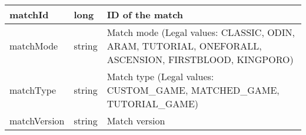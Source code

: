 \begin{longtable}{|llp{5cm}|}
matchId               & long                          & ID of the match                                                                                                                                                                                                                                                                                                                                                                                                                                                                                                                                                                                                                         \\ \hline
matchMode             & string                        & Match mode (Legal values: CLASSIC, ODIN, ARAM, TUTORIAL, ONEFORALL, ASCENSION, FIRSTBLOOD, KINGPORO)                                                                                                                                                                                                                                                                                                                                                                                                                                                                                                                                    \\ \hline
matchType             & string                        & Match type (Legal values: CUSTOM\_GAME, MATCHED\_GAME, TUTORIAL\_GAME)                                                                                                                                                                                                                                                                                                                                                                                                                                                                                                                                                                  \\ \hline
matchVersion          & string                        & Match version                                                                                                                                                                                                                                                                                                                                                                                                                                                                                                                                                                                                                           \\ \hline

\end{longtable}
